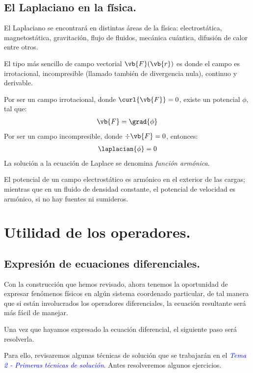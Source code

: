 \subsection{El Laplaciano en la física.}
El Laplaciano se encontrará en distintas áreas de la física: electrostática, magnetostática, gravitación, flujo de fluidos, mecánica cuántica, difusión de calor entre otros.
\par
El tipo más sencillo de campo vectorial $\vb{F}(\vb{r})$ es donde el campo es irrotacional, incompresible (llamado también de divergencia nula), continuo y derivable.
\par
Por ser un campo irrotacional, donde $\curl{\vb{F}} = 0$, existe un potencial $\phi$, tal que:
\begin{align*}
\vb{F} = \grad{\phi}
\end{align*}
Por ser un campo incompresible, donde $\div{\vb{F}} = 0$, entonces:
\begin{align*}
\laplacian{\phi} = 0
\end{align*}
La solución a la ecuación de Laplace se denomina \emph{función armónica}.
\par
El potencial de un campo electrostático es armónico en el exterior de las cargas; mientras que en un fluido de densidad constante, el potencial de velocidad es armónico, si no hay fuentes ni sumideros.
\section{Utilidad de los operadores.}
\subsection{Expresión de ecuaciones diferenciales.}
Con la construcción que hemos revisado, ahora tenemos la oportunidad de expresar fenómenos físicos en algún sistema coordenado particular, de tal manera que si están involucrados los operadores diferenciales, la ecuación resultante será más fácil de manejar.
\par
Una vez que hayamos expresado la ecuación diferencial, el siguiente paso será resolverla.
\par
Para ello, revisaremos algunas técnicas de solución que se trabajarán en el \emph{\textcolor{blue}{Tema 2 - Primeras técnicas de solución}}. Antes resolveremos algunos ejercicios.
